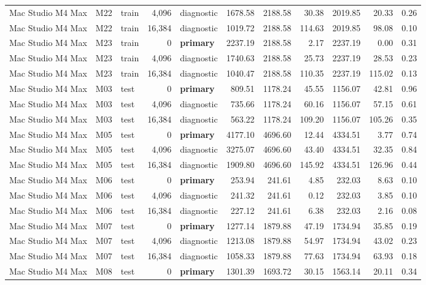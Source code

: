 \documentclass[10pt]{article}
\begin{document}
\begin{landscape}
\begin{longtable}{@{}l l l r l r r r r r r@{}}
Mac Studio M4 Max & M22 & train & 4,096 & diagnostic & 1678.58 & 2188.58 & 30.38 & 2019.85 & 20.33 & 0.26 \\
Mac Studio M4 Max & M22 & train & 16,384 & diagnostic & 1019.72 & 2188.58 & 114.63 & 2019.85 & 98.08 & 0.10 \\
Mac Studio M4 Max & M23 & train & 0 & \textbf{primary} & 2237.19 & 2188.58 & 2.17 & 2237.19 & 0.00 & 0.31 \\
Mac Studio M4 Max & M23 & train & 4,096 & diagnostic & 1740.63 & 2188.58 & 25.73 & 2237.19 & 28.53 & 0.23 \\
Mac Studio M4 Max & M23 & train & 16,384 & diagnostic & 1040.47 & 2188.58 & 110.35 & 2237.19 & 115.02 & 0.13 \\
Mac Studio M4 Max & M03 & test & 0 & \textbf{primary} & 809.51 & 1178.24 & 45.55 & 1156.07 & 42.81 & 0.96 \\
Mac Studio M4 Max & M03 & test & 4,096 & diagnostic & 735.66 & 1178.24 & 60.16 & 1156.07 & 57.15 & 0.61 \\
Mac Studio M4 Max & M03 & test & 16,384 & diagnostic & 563.22 & 1178.24 & 109.20 & 1156.07 & 105.26 & 0.35 \\
Mac Studio M4 Max & M05 & test & 0 & \textbf{primary} & 4177.10 & 4696.60 & 12.44 & 4334.51 & 3.77 & 0.74 \\
Mac Studio M4 Max & M05 & test & 4,096 & diagnostic & 3275.07 & 4696.60 & 43.40 & 4334.51 & 32.35 & 0.84 \\
Mac Studio M4 Max & M05 & test & 16,384 & diagnostic & 1909.80 & 4696.60 & 145.92 & 4334.51 & 126.96 & 0.44 \\
Mac Studio M4 Max & M06 & test & 0 & \textbf{primary} & 253.94 & 241.61 & 4.85 & 232.03 & 8.63 & 0.10 \\
Mac Studio M4 Max & M06 & test & 4,096 & diagnostic & 241.32 & 241.61 & 0.12 & 232.03 & 3.85 & 0.10 \\
Mac Studio M4 Max & M06 & test & 16,384 & diagnostic & 227.12 & 241.61 & 6.38 & 232.03 & 2.16 & 0.08 \\
Mac Studio M4 Max & M07 & test & 0 & \textbf{primary} & 1277.14 & 1879.88 & 47.19 & 1734.94 & 35.85 & 0.19 \\
Mac Studio M4 Max & M07 & test & 4,096 & diagnostic & 1213.08 & 1879.88 & 54.97 & 1734.94 & 43.02 & 0.23 \\
Mac Studio M4 Max & M07 & test & 16,384 & diagnostic & 1058.33 & 1879.88 & 77.63 & 1734.94 & 63.93 & 0.18 \\
Mac Studio M4 Max & M08 & test & 0 & \textbf{primary} & 1301.39 & 1693.72 & 30.15 & 1563.14 & 20.11 & 0.34 \\

\end{longtable}
\end{landscape}
\end{document}
